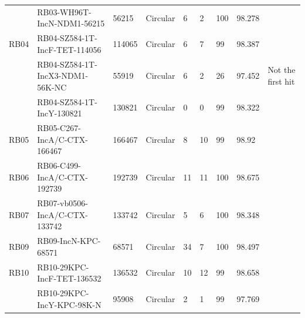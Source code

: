 \documentclass[a4paper,num-refs]{oup-contemporary}
\begin{document}
\begin{landscape}
\begin{table}
\begin{tabular}{l l l l l l l l l}
                         & RB03-WH96T-IncN-NDM1-56215         & 56215         & Circular            & 6                                & 2                                        & 100               & 98.278            &                   \\
RB04                     & RB04-SZ584-1T-IncF-TET-114056      & 114065        & Circular            & 6                                & 7                                        & 99                & 98.387            &                   \\
                         & RB04-SZ584-1T-IncX3-NDM1-56K-NC    & 55919         & Circular            & 6                                & 2                                        & 26                & 97.452            & Not the first hit \\
                         & RB04-SZ584-1T-IncY-130821          & 130821        & Circular            & 0                                & 0                                        & 99                & 98.322            &                   \\
RB05                     & RB05-C267-IncA/C-CTX-166467        & 166467        & Circular            & 8                                & 10                                       & 99                & 98.92             &                   \\
RB06                     & RB06-C499-IncA/C-CTX-192739        & 192739        & Circular            & 11                               & 11                                       & 100               & 98.675            &                   \\
RB07                     & RB07-vb0506-IncA/C-CTX-133742      & 133742        & Circular            & 5                                & 6                                        & 100               & 98.348            &                   \\
RB09                     & RB09-IncN-KPC-68571                & 68571         & Circular            & 34                               & 7                                        & 100               & 98.497            &                   \\
RB10                     & RB10-29KPC-IncF-TET-136532         & 136532        & Circular            & 10                               & 12                                       & 99                & 98.658            &                   \\
                         & RB10-29KPC-IncY-KPC-98K-N          & 95908         & Circular            & 2                                & 1                                        & 99                & 97.769            &                   \\

\end{tabular}
\end{table}
\end{landscape}
\end{document}
